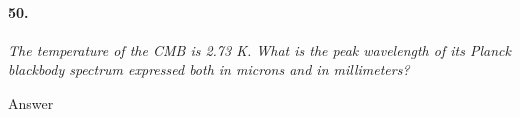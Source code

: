 \documentclass[letterpaper,11pt]{article}
\begin{document}
\paragraph{50.}
\it
The temperature of the CMB is 2.73 K. What is the peak wavelength of its Planck blackbody spectrum expressed both in microns and in millimeters?
\smallskip
	\par
	\normalfont
	Answer
\end{document}
